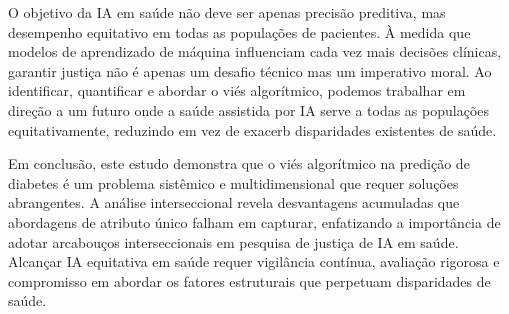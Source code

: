 O objetivo da IA em saúde não deve ser apenas precisão preditiva, mas 
desempenho equitativo em todas as populações de pacientes. À medida que 
modelos de aprendizado de máquina influenciam cada vez mais decisões 
clínicas, garantir justiça não é apenas um desafio técnico mas um 
imperativo moral. Ao identificar, quantificar e abordar o viés algorítmico, 
podemos trabalhar em direção a um futuro onde a saúde assistida por IA 
serve a todas as populações equitativamente, reduzindo em vez de exacerb 
disparidades existentes de saúde.

Em conclusão, este estudo demonstra que o viés algorítmico na predição 
de diabetes é um problema sistêmico e multidimensional que requer soluções 
abrangentes. A análise interseccional revela desvantagens acumuladas que 
abordagens de atributo único falham em capturar, enfatizando a importância 
de adotar arcabouços interseccionais em pesquisa de justiça de IA em 
saúde. Alcançar IA equitativa em saúde requer vigilância contínua, 
avaliação rigorosa e compromisso em abordar os fatores estruturais que 
perpetuam disparidades de saúde.
